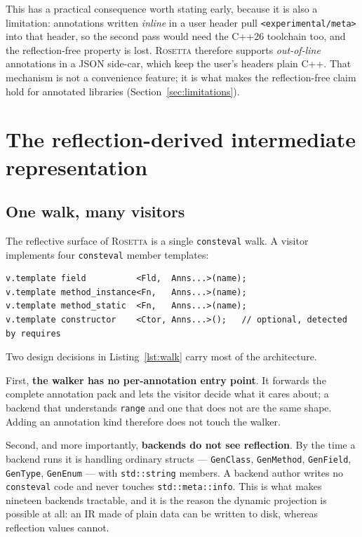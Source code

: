 \documentclass[11pt,a4paper]{article}
\newcommand{\rosetta}{\textsc{Rosetta}}
\newcommand{\code}[1]{\texttt{\small #1}}
\begin{document}
This has a practical consequence worth stating early, because it is also a
limitation: annotations written \emph{inline} in a user header pull
\code{<experimental/meta>} into that header, so the second pass would need the
C++26 toolchain too, and the reflection-free property is lost. \rosetta{}
therefore supports \emph{out-of-line} annotations in a JSON side-car, which keep
the user's headers plain C++. That mechanism is not a convenience feature; it is
what makes the reflection-free claim hold for annotated libraries
(Section~\ref{sec:limitations}).

\section{The reflection-derived intermediate representation}
\label{sec:ir}

\subsection{One walk, many visitors}

The reflective surface of \rosetta{} is a single \code{consteval} walk. A
visitor implements four \code{consteval} member templates:

\begin{lstlisting}[caption={The entire visitor concept. \code{Fld}/\code{Fn} are \code{std::meta::info} non-type template parameters; \code{Anns...} is the member's full annotation pack.},label={lst:walk}]
v.template field          <Fld,  Anns...>(name);
v.template method_instance<Fn,   Anns...>(name);
v.template method_static  <Fn,   Anns...>(name);
v.template constructor    <Ctor, Anns...>();   // optional, detected by requires
\end{lstlisting}

Two design decisions in Listing~\ref{lst:walk} carry most of the architecture.

First, \textbf{the walker has no per-annotation entry point}. It forwards the
complete annotation pack and lets the visitor decide what it cares about; a
backend that understands \code{range} and one that does not are the same shape.
Adding an annotation kind therefore does not touch the walker.

Second, and more importantly, \textbf{backends do not see reflection}. By the
time a backend runs it is handling ordinary structs --- \code{GenClass},
\code{GenMethod}, \code{GenField}, \code{GenType}, \code{GenEnum} --- with
\code{std::string} members. A backend author writes no \code{consteval} code and
never touches \code{std::meta::info}. This is what makes nineteen backends
tractable, and it is the reason the dynamic projection is possible at all: an IR
made of plain data can be written to disk, whereas reflection values cannot.
\end{document}
